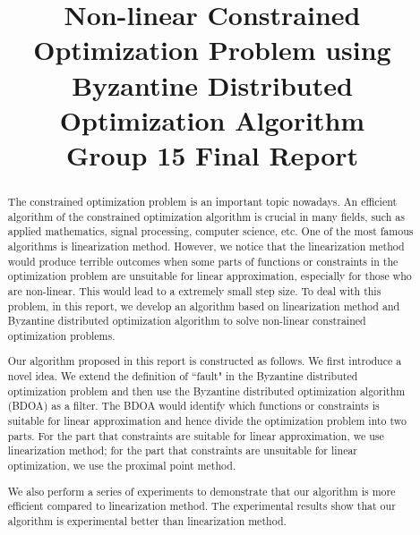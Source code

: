 \documentclass[conference]{IEEEtran}
\begin{document}
\title{Non-linear Constrained Optimization Problem using Byzantine Distributed Optimization Algorithm\\
Group 15 Final Report\\
}




\author{
\and
{}
}



\maketitle

\begin{abstract}
The constrained optimization problem is an important topic nowadays. An efficient algorithm of the constrained optimization algorithm is crucial in many fields, such as applied mathematics, signal processing, computer science, etc. One of the most famous algorithms is linearization method. However, we notice that the linearization method would  produce terrible outcomes when some parts of functions or constraints in the optimization problem are unsuitable for linear approximation, especially for those who are non-linear. This would lead to a extremely small step size. To deal with this problem, in this report, we develop an algorithm based on linearization method and Byzantine distributed optimization algorithm to solve non-linear constrained optimization problems. 

Our algorithm proposed in this report is constructed as follows. We first introduce a novel idea. We extend the definition of ``fault" in the Byzantine distributed optimization problem and then use the Byzantine distributed optimization algorithm (BDOA) as a filter. The BDOA would identify which functions or constraints is suitable for linear approximation and hence divide the optimization problem into two parts. For the part that constraints are suitable for linear approximation, we use linearization method; for the part that constraints are unsuitable for linear optimization, we use the proximal point method. 

We also perform a series of experiments to demonstrate that our algorithm is more efficient compared to linearization method. The experimental results show that our algorithm is experimental better than linearization method.
\end{abstract}
\end{document}
